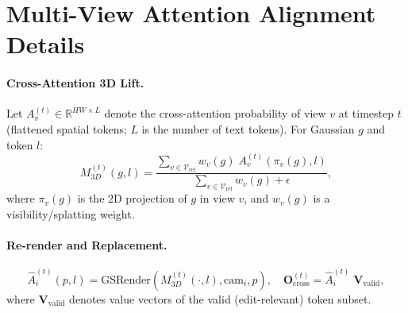 
\section{Multi-View Attention Alignment Details}
\label{app:multi_attn}

\paragraph{Cross-Attention 3D Lift.}
Let $A_v^{(t)} \in \mathbb{R}^{HW \times L}$ denote the cross-attention probability of view $v$ at timestep $t$ (flattened spatial tokens; $L$ is the number of text tokens). For Gaussian $g$ and token $l$:
\begin{equation}
M_{3D}^{(t)}(g,l)
= \frac{\sum_{v \in \mathcal{V}_{\mathrm{ref}}} w_v(g)\; A_v^{(t)}\!\left(\pi_v(g), l\right)}
{\sum_{v \in \mathcal{V}_{\mathrm{ref}}} w_v(g) + \epsilon},
\end{equation}
where $\pi_v(g)$ is the 2D projection of $g$ in view $v$, and $w_v(g)$ is a visibility/splatting weight.

\paragraph{Re-render and Replacement.}
\begin{equation}
\hat{A}_i^{(t)}(p,l) = \mathrm{GSRender}\!\left(M_{3D}^{(t)}(\cdot,l), \mathrm{cam}_i, p\right),
\quad
\mathbf{O}_{\mathrm{cross}}^{(t)} = \hat{A}_i^{(t)} \; \mathbf{V}_{\mathrm{valid}},
\end{equation}
where $\mathbf{V}_{\mathrm{valid}}$ denotes value vectors of the valid (edit-relevant) token subset.
